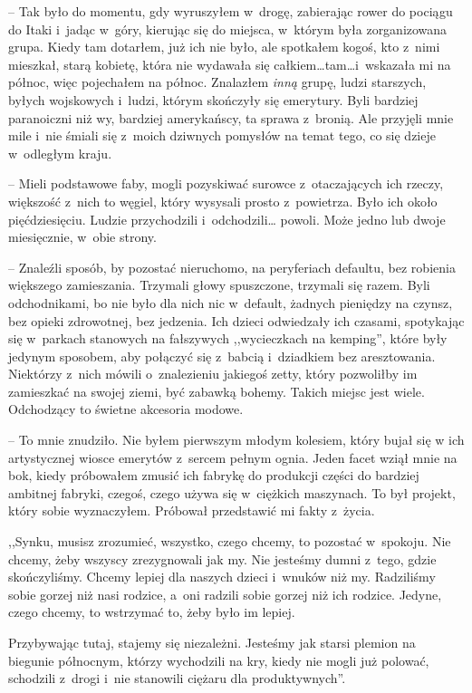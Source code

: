 \documentclass[oneside,polish,11pt,sfheadings]{mwbk}
\begin{document}
-- Tak było do momentu, gdy wyruszyłem w~drogę, zabierając rower do
pociągu do Itaki i~jadąc w~góry, kierując się do miejsca, w~którym była
zorganizowana grupa. Kiedy tam dotarłem, już ich nie było, ale spotkałem
kogoś, kto z~nimi mieszkał, starą kobietę, która nie wydawała się
całkiem\ldots  tam\ldots  i~wskazała mi na północ, więc pojechałem na północ.
Znalazłem \textit{inną} grupę, ludzi starszych, byłych wojskowych i~ludzi,
którym skończyły się emerytury. Byli bardziej paranoiczni niż wy,
bardziej amerykańscy, ta sprawa z~bronią. Ale przyjęli mnie mile i~nie
śmiali się z~moich dziwnych pomysłów na temat tego, co się dzieje w~odległym kraju.

-- Mieli podstawowe faby, mogli pozyskiwać surowce z~otaczających ich
rzeczy, większość z~nich to węgiel, który wysysali prosto z~powietrza.
Było ich około pięćdziesięciu. Ludzie przychodzili i~odchodzili\ldots 
powoli. Może jedno lub dwoje miesięcznie, w~obie strony.

-- Znaleźli sposób, by pozostać nieruchomo, na peryferiach defaultu, bez
robienia większego zamieszania. Trzymali głowy spuszczone, trzymali się
razem. Byli odchodnikami, bo nie było dla nich nic w~default, żadnych
pieniędzy na czynsz, bez opieki zdrowotnej, bez jedzenia. Ich dzieci
odwiedzały ich czasami, spotykając się w~parkach stanowych na fałszywych
,,wycieczkach na kemping'', które były jedynym sposobem, aby połączyć
się z~babcią i~dziadkiem bez aresztowania. Niektórzy z~nich mówili o~znalezieniu jakiegoś zetty, który pozwoliłby im zamieszkać na swojej
ziemi, być zabawką bohemy. Takich miejsc jest wiele. Odchodzący to
świetne akcesoria modowe.

-- To mnie znudziło. Nie byłem pierwszym młodym kolesiem, który bujał się
w ich artystycznej wiosce emerytów z~sercem pełnym ognia. Jeden facet
wziął mnie na bok, kiedy próbowałem zmusić ich fabrykę do produkcji
części do bardziej ambitnej fabryki, czegoś, czego używa się w~ciężkich
maszynach. To był projekt, który sobie wyznaczyłem. Próbował przedstawić
mi fakty z~życia.

,,Synku, musisz zrozumieć, wszystko, czego chcemy, to pozostać w~spokoju. Nie chcemy, żeby wszyscy zrezygnowali jak my. Nie jesteśmy
dumni z~tego, gdzie skończyliśmy. Chcemy lepiej dla naszych dzieci i~wnuków niż my. Radziliśmy sobie gorzej niż nasi rodzice, a~oni radzili
sobie gorzej niż ich rodzice. Jedyne, czego chcemy, to wstrzymać to,
żeby było im lepiej.

Przybywając tutaj, stajemy się niezależni. Jesteśmy jak starsi plemion
na biegunie północnym, którzy wychodzili na kry, kiedy nie mogli już
polować, schodzili z~drogi i~nie stanowili ciężaru dla produktywnych''.
\end{document}
